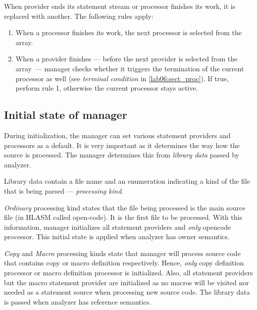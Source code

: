 When provider ends its statement stream or processor finishes its work, it is replaced with another. The following rules apply:

\begin{enumerate}
	\item When a processor finishes its work, the next processor is selected from the array.
	\item When a provider finishes --- before the next provider is selected from the array~--- manager checks whether it triggers the termination of the current processor as well (see \emph{terminal condition} in \cref{lab06:sect_proc}). If true, perform rule 1, otherwise the current processor stays active.
\end{enumerate}

\subsection{Initial state of manager}
\label{lab06:lib_data}

During initialization, the manager can set various statement providers and processors as a default. It is very important as it determines the way how the source is processed. The manager determines this from \emph{library data} passed by analyzer.

Library data contain a file name and an enumeration indicating a kind of the file that is being parsed --- \emph{processing kind}.

\emph{Ordinary} processing kind states that the file being processed is the main source file (in HLASM called open-code). It is the first file to be processed. With this information, manager initializes all statement providers and \emph{only} opencode processor. This initial state is applied when analyzer has owner semantics.

\emph{Copy} and \emph{Macro} processing kinds state that manager will process source code that contains copy or macro definition respectively. Hence, \emph{only} copy definition processor or macro definition processor is initialized. Also, all statement providers but the macro statement provider are initialized as no macros will be visited nor needed as a statement source when processing new source code. The library data is passed when analyzer has reference semantics.



\label{lab06:sect_proc}

